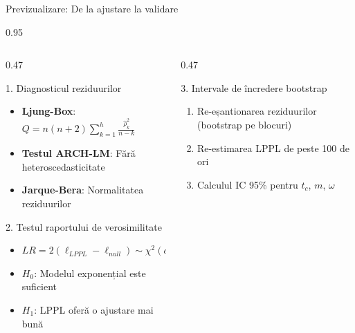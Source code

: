 \documentclass[9pt, aspectratio=169, t]{beamer}
\begin{document}
\begin{frame}{Previzualizare: De la ajustare la validare}
    \begin{cminipage}{0.95\textwidth}
    {\scriptsize
    \begin{columns}[T]
        \begin{column}{0.47\textwidth}
            \begin{block}{1. Diagnosticul reziduurilor}
                \begin{itemize}\setlength{\itemsep}{0pt}
                    \item \textbf{Ljung-Box}: $Q = n(n+2)\sum_{k=1}^{h}\frac{\hat{\rho}_k^2}{n-k}$
                    \item \textbf{Testul ARCH-LM}: Fără heteroscedasticitate
                    \item \textbf{Jarque-Bera}: Normalitatea reziduurilor
                \end{itemize}
            \end{block}

            \begin{alertblock}{2. Testul raportului de verosimilitate}
                \begin{itemize}\setlength{\itemsep}{0pt}
                    \item $LR = 2(\ell_{LPPL} - \ell_{null}) \sim \chi^2(df = 4)$
                    \item $H_0$: Modelul exponențial este suficient
                    \item $H_1$: LPPL oferă o ajustare mai bună
                \end{itemize}
            \end{alertblock}
        \end{column}
        \begin{column}{0.47\textwidth}
            \begin{exampleblock}{3. Intervale de încredere bootstrap}
                \begin{enumerate}\setlength{\itemsep}{0pt}
                    \item Re-eșantionarea reziduurilor (bootstrap pe blocuri)
                    \item Re-estimarea LPPL de peste 100 de ori
                    \item Calculul IC 95\% pentru $t_c$, $m$, $\omega$
                \end{enumerate}
            \end{exampleblock}


\end{column}
\end{columns}}
\end{cminipage}
\end{frame}
\end{document}
